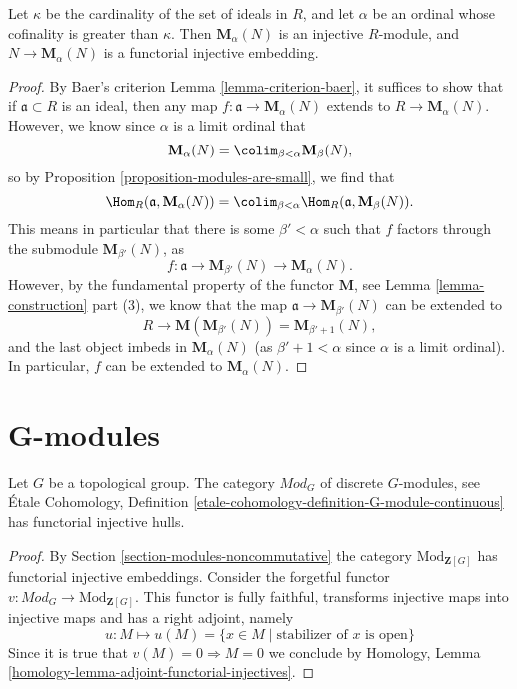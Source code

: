 \begin{theorem}
\label{theorem-baer-grothendieck}
Let $\kappa$ be the cardinality of the set of ideals in $R$, and
let $\alpha$ be an ordinal whose cofinality is greater than
$\kappa$. Then $\mathbf{M}_\alpha(N)$ is an injective $R$-module,
and $N \to \mathbf{M}_\alpha(N)$ is a functorial injective embedding.
\end{theorem}

\begin{proof}
By Baer's criterion
Lemma \ref{lemma-criterion-baer},
it suffices to show that if $\mathfrak{a} \subset R$ is an ideal, then
any map $f : \mathfrak{a} \to \mathbf{M}_\alpha(N)$ extends to
$R \to \mathbf{M}_\alpha(N)$. However, we know since $\alpha$ is a limit
ordinal that
$$
\mathbf{M}_{\alpha}(N) =
\colim_{\beta < \alpha} \mathbf{M}_{\beta}(N),
$$
so by
Proposition \ref{proposition-modules-are-small},
we find that
$$
\Hom_R(\mathfrak{a}, \mathbf{M}_{\alpha}(N)) =
\colim_{\beta < \alpha} \Hom_R(\mathfrak a, \mathbf{M}_{\beta}(N)).
$$
This means in particular that there is some $\beta' < \alpha$
such that $f$ factors through the submodule $\mathbf{M}_{\beta'}(N)$, as
$$
f : \mathfrak{a} \to \mathbf{M}_{\beta'}(N) \to
\mathbf{M}_{\alpha}(N).
$$
However, by the fundamental property of the functor $\mathbf{M}$,
see Lemma \ref{lemma-construction} part (3),
we know that the map $\mathfrak{a} \to \mathbf{M}_{\beta'}(N)$
can be extended to
$$
R \to \mathbf{M}( \mathbf{M}_{\beta'}(N)) =
\mathbf{M}_{\beta' + 1}(N),
$$
and the last object imbeds in $\mathbf{M}_{\alpha}(N)$ (as
$\beta' + 1 < \alpha$ since $\alpha$ is a limit ordinal).
In particular, $f$ can be extended to $\mathbf{M}_{\alpha}(N)$.
\end{proof}




\section{G-modules}
\label{section-G-modules}

\begin{lemma}
\label{lemma-G-modules}
Let $G$ be a topological group.
The category $\textit{Mod}_G$ of discrete $G$-modules, see
\'Etale Cohomology, Definition
\ref{etale-cohomology-definition-G-module-continuous}
has functorial injective hulls.
\end{lemma}

\begin{proof}
By
Section \ref{section-modules-noncommutative}
the category $\text{Mod}_{\mathbf{Z}[G]}$ has functorial
injective embeddings.
Consider the forgetful functor
$v : \textit{Mod}_G \to \text{Mod}_{\mathbf{Z}[G]}$.
This functor is fully faithful, transforms injective maps into
injective maps and has a right adjoint, namely
$$
u : M \mapsto u(M) = \{x \in M \mid \text{stabilizer of }x\text{ is open}\}
$$
Since it is true that $v(M) = 0 \Rightarrow M = 0$ we conclude by
Homology, Lemma \ref{homology-lemma-adjoint-functorial-injectives}.
\end{proof}



